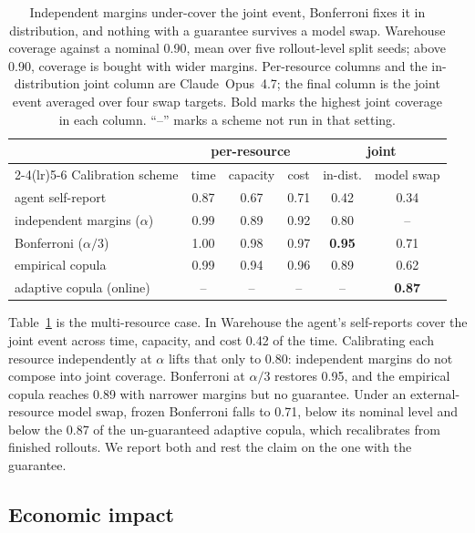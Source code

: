 \documentclass{article}
\begin{document}
\begin{table}[H]
\centering
\caption{Independent margins under-cover the joint event, Bonferroni fixes it in distribution, and nothing with a guarantee survives a model swap. Warehouse coverage against a nominal 0.90, mean over five rollout-level split seeds; above 0.90, coverage is bought with wider margins. Per-resource columns and the in-distribution joint column are Claude~Opus~4.7; the final column is the joint event averaged over four swap targets. Bold marks the highest joint coverage in each column. ``--'' marks a scheme not run in that setting.}
\label{tab:joint}
\small
\begin{tabular}{@{}lccccc@{}}
\toprule
& \multicolumn{3}{c}{per-resource} & \multicolumn{2}{c}{joint} \\
\cmidrule(lr){2-4}\cmidrule(lr){5-6}
Calibration scheme & time & capacity & cost & in-dist. & model swap \\
\midrule
agent self-report & 0.87 & 0.67 & 0.71 & 0.42 & 0.34 \\
independent margins ($\alpha$) & 0.99 & 0.89 & 0.92 & 0.80 & -- \\
Bonferroni ($\alpha/3$) & 1.00 & 0.98 & 0.97 & \textbf{0.95} & 0.71 \\
empirical copula & 0.99 & 0.94 & 0.96 & 0.89 & 0.62 \\
adaptive copula (online) & -- & -- & -- & -- & \textbf{0.87} \\
\bottomrule
\end{tabular}
\end{table}

Table~\ref{tab:joint} is the multi-resource case. In Warehouse the agent's self-reports cover the joint event across time, capacity, and cost 0.42 of the time. Calibrating each resource independently at $\alpha$ lifts that only to 0.80: independent margins do not compose into joint coverage. Bonferroni at $\alpha/3$ restores 0.95, and the empirical copula reaches 0.89 with narrower margins but no guarantee. Under an external-resource model swap, frozen Bonferroni falls to 0.71, below its nominal level and below the 0.87 of the un-guaranteed adaptive copula, which recalibrates from finished rollouts. We report both and rest the claim on the one with the guarantee.

\subsection{Economic impact}
\label{sec:econ}
\end{document}
